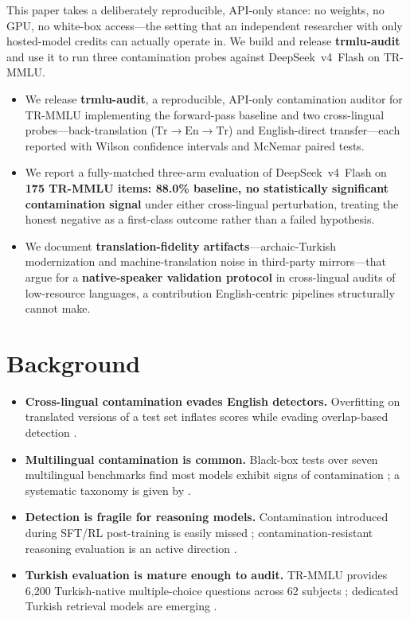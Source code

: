 \documentclass[11pt]{article}
\begin{document}
This paper takes a deliberately reproducible, API-only stance: no weights, no GPU, no white-box access---the setting that an independent researcher with only hosted-model credits can actually operate in. We build and release \textbf{trmlu-audit} and use it to run three contamination probes against DeepSeek~v4~Flash on TR-MMLU.

\begin{itemize}
\item We release \textbf{trmlu-audit}, a reproducible, API-only contamination auditor for TR-MMLU implementing the forward-pass baseline and two cross-lingual probes---back-translation ($\mathrm{Tr}\rightarrow\mathrm{En}\rightarrow\mathrm{Tr}$) and English-direct transfer---each reported with Wilson confidence intervals and McNemar paired tests.
\item We report a fully-matched three-arm evaluation of DeepSeek~v4~Flash on \textbf{175 TR-MMLU items: 88.0\% baseline, no statistically significant contamination signal} under either cross-lingual perturbation, treating the honest negative as a first-class outcome rather than a failed hypothesis.
\item We document \textbf{translation-fidelity artifacts}---archaic-Turkish modernization and machine-translation noise in third-party mirrors---that argue for a \textbf{native-speaker validation protocol} in cross-lingual audits of low-resource languages, a contribution English-centric pipelines structurally cannot make.
\end{itemize}

\section{Background}

\begin{itemize}
\item \textbf{Cross-lingual contamination evades English detectors.} Overfitting on translated versions of a test set inflates scores while evading overlap-based detection \cite{yang2024data}.
\item \textbf{Multilingual contamination is common.} Black-box tests over seven multilingual benchmarks find most models exhibit signs of contamination \cite{contammulti2024}; a systematic taxonomy is given by \cite{taxonomy2024}.
\item \textbf{Detection is fragile for reasoning models.} Contamination introduced during SFT/RL post-training is easily missed \cite{fragile2025reasoning}; contamination-resistant reasoning evaluation is an active direction \cite{beyondbench2025,constat2024}.
\item \textbf{Turkish evaluation is mature enough to audit.} TR-MMLU provides 6{,}200 Turkish-native multiple-choice questions across 62 subjects \cite{trmmu2024}; dedicated Turkish retrieval models are emerging \cite{turkembed2025}.
\end{itemize}
\end{document}
